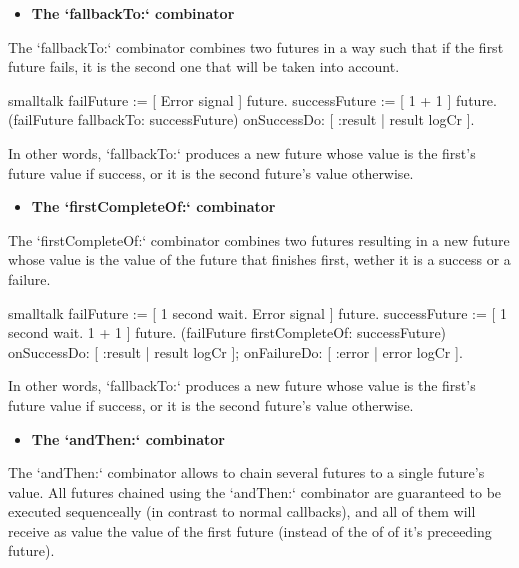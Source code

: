 \documentclass[10pt,twoside,english]{_support/latex/sbabook/sbabook}
\begin{document}
\begin{itemize}
\item \textbf{The `fallbackTo:` combinator}
\end{itemize}

The `fallbackTo:` combinator combines two futures in a way such that if the first future fails, it is the second one that will be taken into account.

\begin{displaycode}{smalltalk}
failFuture := [ Error signal ] future.
successFuture := [ 1 + 1 ] future.
(failFuture fallbackTo: successFuture)
    onSuccessDo: [ :result | result logCr ].
\end{displaycode}

In other words, `fallbackTo:` produces a new future whose value is the first's future value if success, or it is the second future's value otherwise. 

\begin{itemize}
\item \textbf{The `firstCompleteOf:` combinator}
\end{itemize}

The `firstCompleteOf:` combinator combines two futures resulting in a new future whose value is the value of the future that finishes first, wether it is a success or a failure.

\begin{displaycode}{smalltalk}
failFuture := [ 1 second wait. Error signal ] future.
successFuture := [ 1 second wait. 1 + 1 ] future.
(failFuture firstCompleteOf: successFuture)
    onSuccessDo: [ :result | result logCr ];
    onFailureDo: [ :error | error logCr ].
\end{displaycode}

In other words, `fallbackTo:` produces a new future whose value is the first's future value if success, or it is the second future's value otherwise.

\begin{itemize}
\item \textbf{The `andThen:` combinator}
\end{itemize}

The `andThen:` combinator allows to chain several futures to a single future's value. All futures chained using the `andThen:` combinator are guaranteed to be executed sequenceally (in contrast to normal callbacks), and all of them will receive as value the value of the first future (instead of the of of it's preceeding future).
\end{document}
